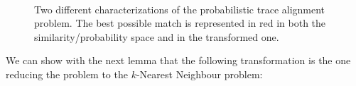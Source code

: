 \begin{figure}[!t]
	\centering
	\qquad
	\\
	\caption{Two different characterizations of the probabilistic trace alignment problem. The best possible match is represented in red in both the similarity/probability space and in the transformed one.}
\end{figure}


 We can show with the next lemma that the following transformation is the one reducing the problem to the $k$-Nearest Neighbour problem:



